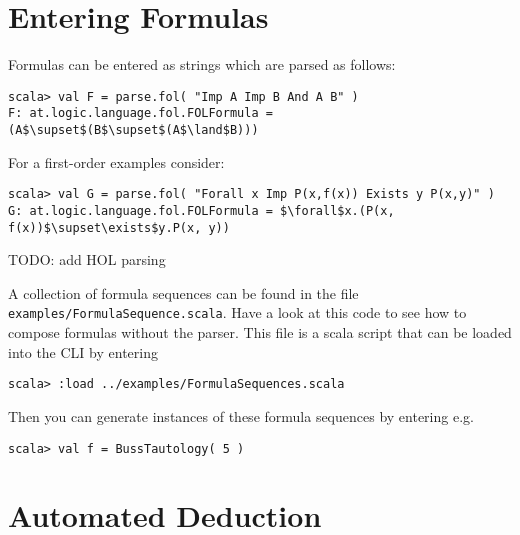 \documentclass[a4paper,11pt]{article}
\renewcommand{\land}{\wedge}
\newenvironment{meta}{\color{red}}{\color{black}}
\begin{document}

\section{Entering Formulas}\label{sec.entering_formulas}

Formulas can be entered as strings which are parsed as follows:
\begin{lstlisting}
scala> val F = parse.fol( "Imp A Imp B And A B" )
F: at.logic.language.fol.FOLFormula = (A$\supset$(B$\supset$(A$\land$B)))
\end{lstlisting}
For a first-order examples consider:
\begin{lstlisting}
scala> val G = parse.fol( "Forall x Imp P(x,f(x)) Exists y P(x,y)" )
G: at.logic.language.fol.FOLFormula = $\forall$x.(P(x, f(x))$\supset\exists$y.P(x, y))
\end{lstlisting}


\begin{meta}
TODO: add HOL parsing
\end{meta}

A collection of formula sequences can be found in the file {\tt examples/FormulaSequence.scala}.
Have a look at this code to see how to compose formulas without the parser. This file is
a scala script that can be loaded into the CLI by entering
%
\begin{lstlisting}
scala> :load ../examples/FormulaSequences.scala
\end{lstlisting}
%
Then you can generate instances of these formula sequences by entering e.g.
%
\begin{lstlisting}
scala> val f = BussTautology( 5 )
\end{lstlisting}



\section{Automated Deduction}
  
\end{document}
